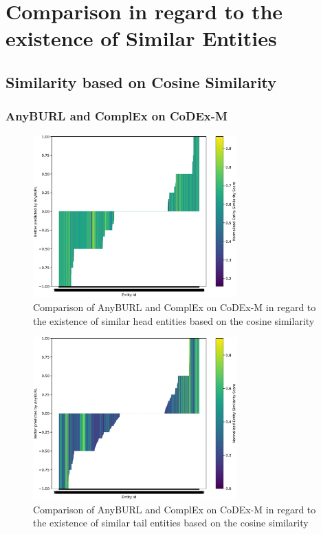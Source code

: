 \section{Comparison in regard to the existence of Similar Entities}
\label{appendix:similar_entities}

\subsection{Similarity based on Cosine Similarity}
\subsubsection{AnyBURL and ComplEx on CoDEx-M}
\begin{figure}[H]
\centering
\includegraphics[width=0.7\textwidth]{images/head_similarity_anyburl_complex_codex.PNG}
\caption{Comparison of AnyBURL and ComplEx on CoDEx-M in regard to the existence of similar head entities based on the cosine similarity}
\label{fig:head_similarity_anyburl_complex_codex}
\end{figure}

\begin{figure}[H]
\centering
\includegraphics[width=0.7\textwidth]{images/tail_similarity_anyburl_complex_codex.PNG}
\caption{Comparison of AnyBURL and ComplEx on CoDEx-M in regard to the existence of similar tail entities based on the cosine similarity}
\label{fig:tail_similarity_anyburl_complex_codex}
\end{figure}

